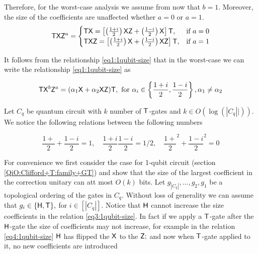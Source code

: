  Therefore, for the worst-case analysis we assume from now that $b=1.$ Moreover, the size of the coefficients are unaffected whether $a=0$ or $a=1.$  
\begin{equation}
 \label{eq2:1qubit-size}
 {\sf T} {\sf X} {\sf Z}^a= 
\begin{cases}
   {\sf T} {\sf X} =\left[\left(\frac{1+i}{2}\right) {\sf X} {\sf Z} + \left(\frac{1-i}{2}\right){\sf X} \right] {\sf T}, & \text{if } a=0\\
   {\sf T} {\sf X}{\sf Z}= \left[\left(\frac{1+i}{2}\right) {\sf X}  + \left(\frac{1-i}{2}\right){\sf X} {\sf Z}\right] {\sf T},              & \text{if } a=1
\end{cases}
\end{equation}

It follows from the relationship \ref{eq1:1qubit-size} that in the worst-case we can write the relationship \ref{eq1:1qubit-size} as

 \begin{equation}
 \label{eq3:1qubit-size}
{\sf T} {\sf X}^b {\sf Z}^a=(\alpha_1 {\sf X} +\alpha_2 {\sf X}{\sf Z}){\sf T}, \mbox{ for } \alpha_i\in\left\{\frac{1+i}{2}, \frac{1-i}{2}\right\}, \alpha_1\neq\alpha_2
\end{equation}
 
 Let $C_q$ be  quantum circuit with $k$ number of ${\sf T}$-gates and $k\in O(\log(|C_q||)).$  We notice the following relations between the following numbers
 
\begin{equation}
 \label{relation:complex}
\frac{1+}{2}+ \frac{1-i}{2}=1, \quad \frac{1+i}{2}\frac{1-i}{2}=1/2, \quad \frac{1+}{2}^2+ \frac{1-i}{2}^2=0
\end{equation}
 
 For convenience we first consider the case for 1-qubit circuit (section \ref{QiO:Clifford+T:family+GT}) and show that the size of the largest coefficient in the correction unitary can att most $O(k)$ bits.  Let $g_{|C_q|},\dots, g_2,g_1$ be a topological ordering of the gates in  $C_q.$  Without loss of generality we can assume that $g_i\in\{{\sf H}, {\sf T}\},$ for $i\in [|C_q|].$  Notice that ${\sf H}$ cannot increase the  size  coefficients in the relation \ref{eq3:1qubit-size}. In fact if we apply a ${\sf T}$-gate after the ${\sf H}$-gate the size of coefficients may not increase, for example in the relation \ref{eq4:1qubit-size} ${\sf H}$ has flipped the ${\sf X}$ to the ${\sf Z};$  and now when ${\sf T}$-gate applied to it, no new coefficients are introduced


